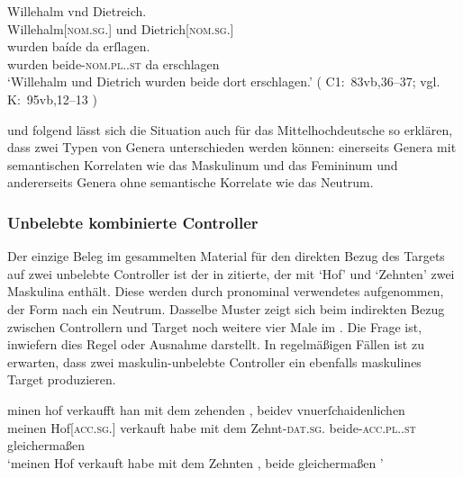 \begin{exe}
\ex\label{ex:dietwill3}
		\gll Willehalm vnd Dietreich. \\
			Willehalm[\textsc{nom.sg.\MascM}] und Dietrich[\textsc{nom.sg.\MascM}] \\
	\sn \gll wurden baíde da erſlagen. \\
			wurden beide-\textsc{nom.pl.\MascM.st} da erschlagen \\
		\trans `Willehalm und Dietrich wurden beide dort erschlagen.'
			(%
				C1:~83vb,36--37; vgl.
				K:~95vb,12--13%
			)
\end{exe}

\citet[576]{wechsler2009} und \citet[182]{wechslerzlatic2003} folgend lässt
sich die Situation auch für das Mittelhochdeutsche so
erklären, dass zwei Typen von Genera unterschieden werden können:
einerseits Genera mit semantischen Korrelaten wie das Maskulinum und das
Femininum und andererseits Genera ohne semantische Korrelate wie das Neutrum.


\subsubsection{Unbelebte kombinierte Controller}
\label{subsubsec:x+x_dir_inan}

Der einzige Beleg im gesammelten Material für den direkten Bezug des
Targets auf zwei unbelebte Controller ist der in
 zitierte, der mit  `Hof' und 
`Zehnten' zwei Maskulina enthält. Diese werden durch pronominal verwendetes
 aufgenommen, der Form nach ein Neutrum. Dasselbe Muster zeigt sich
beim indirekten Bezug zwischen Controllern und Target noch weitere vier Male im
\CAO{}. Die Frage ist, inwiefern dies Regel oder Ausnahme
darstellt. In regelmäßigen Fällen ist zu erwarten, dass zwei maskulin-unbelebte
Controller ein ebenfalls maskulines Target produzieren.

\begin{exe}
\ex\label{ex:hofzehntbeidiu}
	\gll minen hof \textelp{} verkaufft han mit dem
			zehenden \textelp{}, beidev vnuerſchaidenlichen
			\\
			meinen Hof[\textsc{acc.sg.\MascI}] {} verkauft habe mit dem
			Zehnt-\textsc{dat.sg.\MascI} {} beide-\textsc{acc.pl.\NeutI.st}
			gleichermaßen
			\\
	\trans `meinen Hof verkauft habe mit dem Zehnten \textelp{}, beide
		gleichermaßen%
		'
		\parencites(Nr.~N~241, Augsburg, 1283)[195,37--39]{cao5}
\end{exe}

